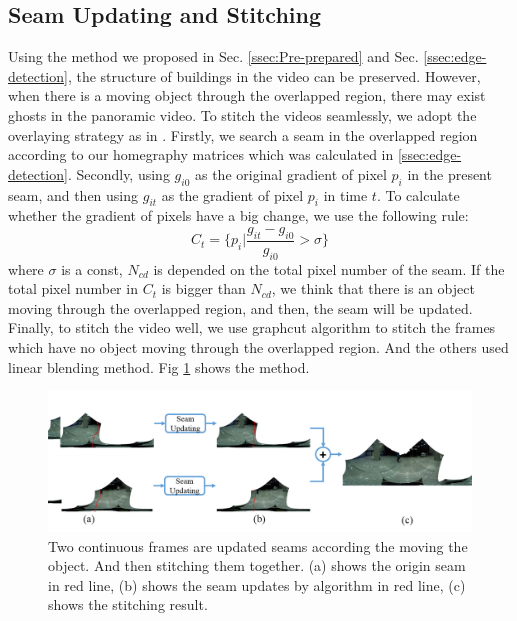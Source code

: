 \documentclass[conference]{IEEEtran}
\begin{document}
\subsection{Seam Updating and Stitching}
\label{ssec:stitching}

Using the method we proposed in Sec. \ref{ssec:Pre-prepared} and Sec. \ref{ssec:edge-detection}, the structure of buildings in the video can be preserved. However, when there is a moving object
through the overlapped region, there may exist ghosts in the panoramic video. 
To stitch the videos seamlessly, we adopt the overlaying strategy as in \cite{he2016parallax}. 
Firstly, we search a seam in the overlapped region according to our homegraphy matrices which was calculated in \ref{ssec:edge-detection}.
Secondly, using $g_{i0}$ as the original gradient of pixel $p_i$ in the present seam, and then using $g_{it}$ as the gradient of pixel $p_i$ in time $t$. 
To calculate whether the gradient of pixels have a big change, we use the following rule:
\begin{equation}
\textit{C}_{t}=\{p_{i}|\frac{g_{it}-g_{i0}}{g_{i0}}>\sigma\}
\end{equation}
where $\sigma$ is a const, $\textit{N}_{cd}$ is depended on the total pixel number of the seam. If the total pixel number in $\textit{C}_t$ is bigger than $\textit{N}_{cd}$, 
we think that there is an object moving through the overlapped region, and then, the seam will be updated. Finally, to stitch the video well, 
we use graphcut algorithm \cite{boykov2004experimental} to stitch the frames which have no object moving through the overlapped region. 
And the others used linear blending method.
Fig \ref{fig:p24} shows the method.
\begin{figure}[h]
\centering
\includegraphics[scale=0.25]{picture43.png}
\caption{Two continuous frames are updated seams according the moving the object. And then stitching them together. (a) shows the origin seam in red line, (b) shows the seam updates 
by algorithm \cite{he2016parallax} in red line,
(c) shows the stitching result.}
\label{fig:p24}
\end{figure}
\end{document}
